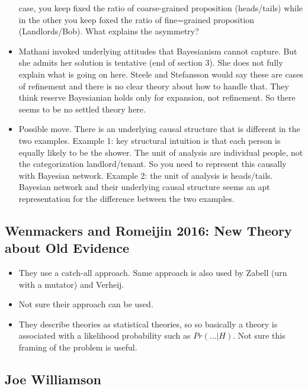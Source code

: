 \documentclass[
  11pt,
  dvipsnames,enabledeprecatedfontcommands]{scrartcl}
\begin{document}
\begin{itemize}
  case, you keep fixed the ratio of coarse-grained proposition
  (heads/tails) while in the other you keep foxed the ratio of
  fine=grained proposition (Landlords/Bob). What explains the asymmetry?
\item
  Mathani invoked underlying attitudes that Bayesianism cannot capture.
  But she admits her solution is tentative (end of section 3). She does
  not fully explain what is going on here. Steele and Stefansson would
  say these are cases of refinement and there is no clear theory about
  how to handle that. They think reserve Bayesianian holds only for
  expansion, not refinement. So there seems to be no settled theory
  here.
\item
  Possible move. There is an underlying causal structure that is
  different in the two examples. Example 1: key structural intuition is
  that each person is equally likely to be the shower. The unit of
  analysis are individual people, not the categorization
  landlord/tenant. So you need to represent this causally with Bayesian
  network. Example 2: the unit of analysis is heads/tails. Bayesian
  network and their underlying causal structure seems an apt
  representation for the difference between the two examples.
\end{itemize}

\hypertarget{wenmackers-and-romeijin-2016-new-theory-about-old-evidence}{%
\subsection{Wenmackers and Romeijin 2016: New Theory about Old
Evidence}\label{wenmackers-and-romeijin-2016-new-theory-about-old-evidence}}

\begin{itemize}
\item
  They use a catch-all approach. Same approach is also used by Zabell
  (urn with a mutator) and Verheij.
\item
  Not sure their approach can be used.
\item
  They describe theories as statistical theories, so so basically a
  theory is associated with a likelihood probability such as
  \(Pr(... \vert H)\). Not sure this framing of the problem is useful.
\end{itemize}

\hypertarget{joe-williamson}{%
\subsection{Joe Williamson}\label{joe-williamson}}
\end{document}
